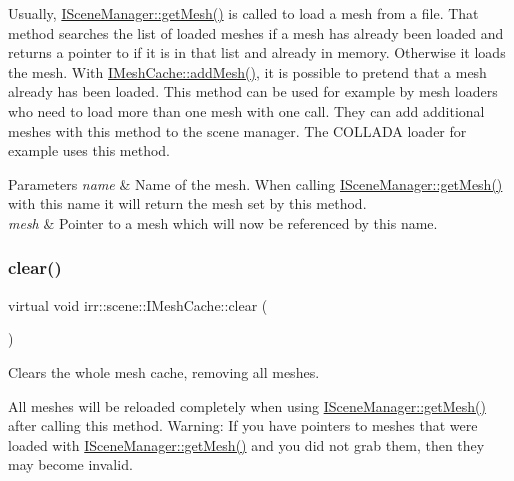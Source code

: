 Usually, \hyperlink{classirr_1_1scene_1_1ISceneManager_a63894c3f3d46cfc385116f1705935e03}{I\+Scene\+Manager\+::get\+Mesh()} is called to load a mesh from a file. That method searches the list of loaded meshes if a mesh has already been loaded and returns a pointer to if it is in that list and already in memory. Otherwise it loads the mesh. With \hyperlink{classirr_1_1scene_1_1IMeshCache_a2959812a3a393817b1db42761766c49b}{I\+Mesh\+Cache\+::add\+Mesh()}, it is possible to pretend that a mesh already has been loaded. This method can be used for example by mesh loaders who need to load more than one mesh with one call. They can add additional meshes with this method to the scene manager. The C\+O\+L\+L\+A\+DA loader for example uses this method. 
\begin{DoxyParams}{Parameters}
{\em name} & Name of the mesh. When calling \hyperlink{classirr_1_1scene_1_1ISceneManager_a63894c3f3d46cfc385116f1705935e03}{I\+Scene\+Manager\+::get\+Mesh()} with this name it will return the mesh set by this method. \\
\hline
{\em mesh} & Pointer to a mesh which will now be referenced by this name. \\
\hline
\end{DoxyParams}
\mbox{\label{classirr_1_1scene_1_1IMeshCache_ad92d924e558c3a7504f9154ee29b1569}} 
\subsubsection{\texorpdfstring{clear()}{clear()}}
{\footnotesize\ttfamily virtual void irr\+::scene\+::\+I\+Mesh\+Cache\+::clear (\begin{DoxyParamCaption}{ }\end{DoxyParamCaption})\hspace{0.3cm}{\ttfamily [pure virtual]}}



Clears the whole mesh cache, removing all meshes. 

All meshes will be reloaded completely when using \hyperlink{classirr_1_1scene_1_1ISceneManager_a63894c3f3d46cfc385116f1705935e03}{I\+Scene\+Manager\+::get\+Mesh()} after calling this method. Warning\+: If you have pointers to meshes that were loaded with \hyperlink{classirr_1_1scene_1_1ISceneManager_a63894c3f3d46cfc385116f1705935e03}{I\+Scene\+Manager\+::get\+Mesh()} and you did not grab them, then they may become invalid. \mbox{\label{classirr_1_1scene_1_1IMeshCache_a9f3e20b8e0f66d59bc454a311d13bbee}} 
